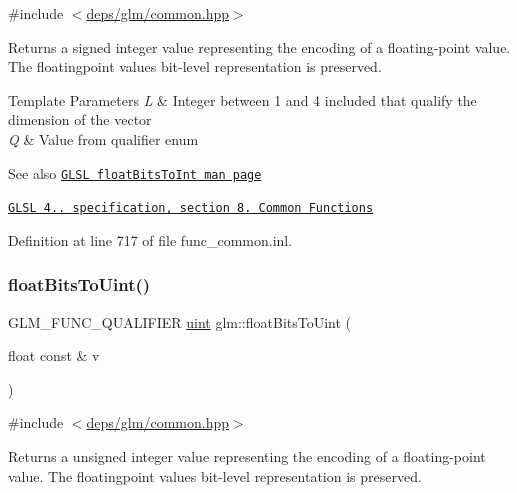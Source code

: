 {\ttfamily \#include $<$\hyperlink{common_8hpp}{deps/glm/common.\+hpp}$>$}

Returns a signed integer value representing the encoding of a floating-\/point value. The floatingpoint value\textquotesingle{}s bit-\/level representation is preserved.


\begin{DoxyTemplParams}{Template Parameters}
{\em L} & Integer between 1 and 4 included that qualify the dimension of the vector \\
\hline
{\em Q} & Value from qualifier enum\\
\hline
\end{DoxyTemplParams}
\begin{DoxySeeAlso}{See also}
\href{http://www.opengl.org/sdk/docs/manglsl/xhtml/floatBitsToInt.xml}{\tt G\+L\+SL float\+Bits\+To\+Int man page} 

\href{http://www.opengl.org/registry/doc/GLSLangSpec.4.20.8.pdf}{\tt G\+L\+SL 4.. specification, section 8. Common Functions} 
\end{DoxySeeAlso}


Definition at line 717 of file func\+\_\+common.\+inl.

\mbox{\label{group__core__func__common_ga748b4d2819b48d28ca09dc8733488873}} 
\subsubsection{\texorpdfstring{float\+Bits\+To\+Uint()}{floatBitsToUint()}\hspace{0.1cm}{\footnotesize\ttfamily [1/2]}}
{\footnotesize\ttfamily G\+L\+M\+\_\+\+F\+U\+N\+C\+\_\+\+Q\+U\+A\+L\+I\+F\+I\+ER \hyperlink{group__core__precision_ga4fd29415871152bfb5abd588334147c8}{uint} glm\+::float\+Bits\+To\+Uint (\begin{DoxyParamCaption}\item[{float const \&}]{v }\end{DoxyParamCaption})}



{\ttfamily \#include $<$\hyperlink{common_8hpp}{deps/glm/common.\+hpp}$>$}

Returns a unsigned integer value representing the encoding of a floating-\/point value. The floatingpoint value\textquotesingle{}s bit-\/level representation is preserved.

